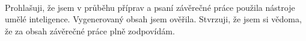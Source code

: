\documentclass[czech,master,oneside]{ctufit-thesis}
\begin{document}
~
\vfill

\noindent Prohlašuji, že jsem v průběhu příprav a psaní závěrečné práce použila nástroje umělé
inteligence. Vygenerovaný obsah jsem ověřila. Stvrzuji, že jsem si vědoma, že za obsah
závěrečné práce plně zodpovídám.

\vfill
\clearpage

\printtwopageabstract

% 
% 
% 
% 
% 
% 
% 
% 
% 

\tableofcontents %
\listoffigures %
\begingroup
\let\clearpage\relax
\thectufitlistingscommand{} %
\thectufitlistofalgorithmscommand{} %
\endgroup
\end{document}
